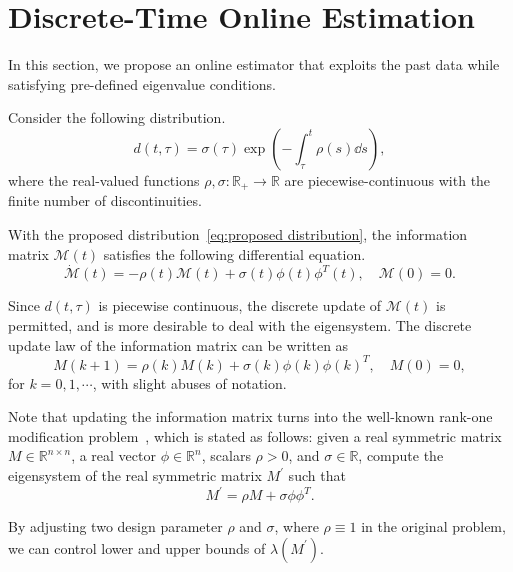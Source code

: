 \documentclass[]{IEEEtran}
\theoremstyle{definition}
\theoremstyle{remark}
\newcommand{\MB}[1]{\mathbb{#1}}
\newcommand{\MC}[1]{\mathcal{#1}}
\begin{document}
\section{Discrete-Time Online Estimation}

In this section, we propose an online estimator that exploits the past data
while satisfying pre-defined eigenvalue conditions. 

Consider the following distribution.
\begin{equation}\label{eq:proposed distribution}
	d(t, \tau) = \sigma(\tau) \exp( -\int_\tau^t \rho(s) \dd{s} ),
\end{equation}
where the real-valued functions $\rho, \sigma : \MB{R}_{+} \to \MB{R}$ are
piecewise-continuous with the finite number of discontinuities.

With the proposed distribution~\eqref{eq:proposed distribution}, the
information matrix $\MC{M}(t)$ satisfies the following differential equation.
\begin{equation}\label{eq:information matrix differential equation}
	\dot{\MC{M}}(t) = - \rho(t) \MC{M}(t) + \sigma(t) \phi(t) \phi^T(t), \quad
	\MC{M}(0) = 0.
\end{equation}

Since $d(t, \tau)$ is piecewise continuous, the discrete update of $\MC{M}(t)$
is permitted, and is more desirable to deal with the eigensystem. The discrete
update law of the information matrix can be written as
\begin{equation}
	M(k+1) = \rho(k) M(k) + \sigma(k) \phi(k) \phi(k)^T, \quad M(0) = 0,
\end{equation}
for $k = 0, 1, \cdots$, with slight abuses of notation.

Note that updating the information matrix turns into the well-known rank-one
modification problem~\cite{bunch_rank-one_1978}, which is stated as follows:
given a real symmetric matrix $M \in \MB{R}^{n \times n}$, a real vector
$\phi \in \MB{R}^n$, scalars $\rho > 0$, and $\sigma \in \MB{R}$, compute
the eigensystem of the real symmetric matrix $M^\prime$ such that
\begin{equation}
	M^\prime = \rho M + \sigma \phi \phi^T.
\end{equation}

By adjusting two design parameter $\rho$ and $\sigma$, where $\rho \equiv 1$ in
the original problem, we can control lower and upper bounds of
$\lambda(M^\prime)$.

\end{document}
